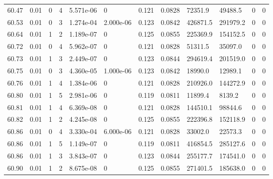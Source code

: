 \documentclass[preview]{standalone}
\begin{document}
{{{{{{{{{{{{{{{{{\begin{tabular}{L{1.2cm}C{1.2cm} C{0.3cm}C{0.5cm} C{1.4cm}C{1.4cm} C{1.4cm}C{1.4cm} C{1.6cm}C{1.6cm} C{1.6cm}C{1.6cm}}
  60.47  &  0.01  & 0     &  4 &  5.571e-06  & 0  &  0.121&   0.0828& 72351.9 & 49488.5   &  0 & 0  \\ 
  60.53  &  0.01  & 0     &  3 &  1.274e-04  & 2.000e-06  &  0.123&   0.0842& 426871.5 & 291979.2   &  0 & 0  \\ 
  60.64  &  0.01  & 1     &  2 &  1.189e-07  & 0  &  0.125&   0.0855& 225369.9 & 154152.5   &  0 & 0  \\ 
  60.72  &  0.01  & 0     &  4 &  5.962e-07  & 0  &  0.121&   0.0828& 51311.5 & 35097.0   &  0 & 0  \\ 
  60.73  &  0.01  & 1     &  3 &  2.449e-07  & 0  &  0.123&   0.0844& 294619.4 & 201519.0   &  0 & 0  \\ 
  60.75  &  0.01  & 0     &  3 &  4.360e-05  & 1.000e-06  &  0.123&   0.0842& 18990.0 & 12989.1   &  0 & 0  \\ 
  60.76  &  0.01  & 1     &  4 &  1.384e-06  & 0  &  0.121&   0.0828& 210926.0 & 144272.9   &  0 & 0  \\ 
  60.80  &  0.01  & 1     &  5 &  2.981e-06  & 0  &  0.119&   0.0811& 11899.4 & 8139.2   &  0 & 0  \\ 
  60.81  &  0.01  & 1     &  4 &  6.369e-08  & 0  &  0.121&   0.0828& 144510.1 & 98844.6   &  0 & 0  \\ 
  60.82  &  0.01  & 1     &  2 &  4.245e-08  & 0  &  0.125&   0.0855& 222396.8 & 152118.9   &  0 & 0  \\ 
  60.86  &  0.01  & 0     &  4 &  3.330e-04  & 6.000e-06  &  0.121&   0.0828& 33002.0 & 22573.3   &  0 & 0  \\ 
  60.86  &  0.01  & 1     &  5 &  1.149e-07  & 0  &  0.119&   0.0811& 416854.5 & 285127.6   &  0 & 0  \\ 
  60.86  &  0.01  & 1     &  3 &  3.843e-07  & 0  &  0.123&   0.0844& 255177.7 & 174541.0   &  0 & 0  \\ 
  60.90  &  0.01  & 1     &  2 &  8.675e-08  & 0  &  0.125&   0.0855& 271401.5 & 185638.0   &  0 & 0  \\ 
\hline 
\end{tabular} 

}}}}}}}}}}}}}}}}}
\end{document}
